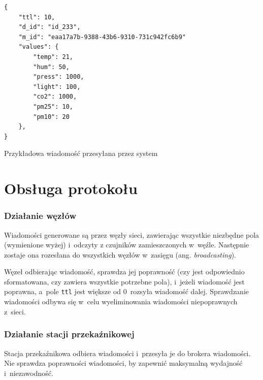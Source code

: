 \begin{lstfloat}[h!]
    \lstset{language=JavaScript}
    \begin{lstlisting}[frame=single]
{
    "ttl": 10,
    "d_id": "id_233",
    "m_id": "eaa17a7b-9388-43b6-9310-731c942fc6b9"
    "values": {
        "temp": 21,
        "hum": 50,
        "press": 1000,
        "light": 100,
        "co2": 1000,
        "pm25": 10,
        "pm10": 20
    },
}          
\end{lstlisting}
    \caption{Przykładowa wiadomość przesyłana przez system}\label{lst:packet_format}
\end{lstfloat}

\section{Obsługa protokołu}

\subsubsection{Działanie węzłów}
Wiadomości generowane są przez węzły sieci, zawierając wszystkie niezbędne pola (wymienione wyżej) i~odczyty z czujników zamieszczonych w~węźle.
Następnie zostaje ona rozesłana do wszystkich węzłów w~zasięgu (ang. \emph{broadcasting}).

Węzeł odbierając wiadomość, sprawdza jej poprawność (czy jest odpowiednio sformatowana, czy zawiera wszystkie potrzebne pola), i~jeżeli wiadomość jest poprawna, a~pole \texttt{ttl} jest większe od 0~rozsyła wiadomość dalej.
Sprawdzanie wiadomości odbywa się w~celu wyeliminowania wiadomości niepoprawnych z~sieci.

\subsubsection{Działanie stacji przekaźnikowej}
Stacja przekaźnikowa odbiera wiadomości i~przesyła je do brokera wiadomości.
Nie sprawdza poprawności wiadomości, by zapewnić maksymalną wydajność i~niezawodność.

